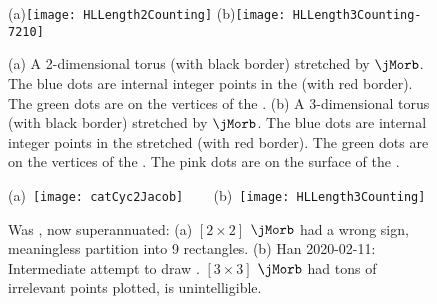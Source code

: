 \begin{description}

\begin{figure}
  \centering
(a)\texttt{[image: HLLength2Counting]}
(b)\texttt{[image: HLLength3Counting-7210]}
  \caption{\label{fig:HLCountingFigures}
(a) A 2-dimensional torus (with black border) stretched by $\jMorb$.
    The {\color{blue} blue} dots are internal integer points in the
    {\fundPip} (with red border). The {\color{green} green}
    dots are on the vertices of the {\fundPip}.
(b) A 3-dimensional torus (with black border) stretched by $\jMorb$.
    The {\color{blue} blue} dots are internal integer points in the
    stretched {\fundPip} (with red border). The {\color{green} green}
    dots are on the vertices of the {\fundPip}. The {
    pink} dots are on the surface of the {\fundPip}.
}
\end{figure}

\begin{figure}
  \centering
(a)~\texttt{[image: catCyc2Jacob]}
~~~
(b)~\texttt{[image: HLLength3Counting]}
  \caption{\label{fig:catCycJacobOld}
Was , now superannuated:
(a)
    $[2\!\times\!2]$ {\jacobianOrb} $\jMorb$ 
    had a wrong sign, meaningless partition into 9 rectangles.
(b) Han 2020-02-11: Intermediate attempt to draw .
$[3\!\times\!3]$ {\jacobianOrb} $\jMorb$  had tons of irrelevant points plotted,
    is unintelligible.
}
\end{figure}


\end{description}
